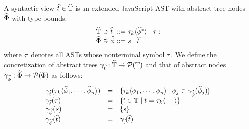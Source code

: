 A syntactic view $\widehat{t} \in \widehat{\mathbb{T}}$ is an extended JavaScript AST with
abstract tree nodes $\widehat{\Phi}$ with type bounds:
\[
  \begin{array}{l@{~}c@{~}l@{~}c@{~}l}
    \atreeset &\ni& \atree &::=& \ty_k \langle \anode^* \rangle \mid \ty: \\
    \anodeset &\ni& \anode &::=& \str \mid \atree\\
  \end{array}
\]
where $\tau$ denotes all ASTs whose nonterminal symbol $\tau$. We define the
concretization of abstract trees $\gamma_{\widehat{t}}: \widehat{\mathbb{T}} \rightarrow
\mathcal{P}(\mathbb{T})$ and that of abstract nodes $\gamma_{\widehat{\phi}}: \widehat{\Phi}
\rightarrow \mathcal{P}(\Phi)$ as follows:
\[
  \begin{array}{lcl}
    \gamma_{\widehat{t}}(\tau_k \langle \widehat{\phi}_1, \cdots, \widehat{\phi}_n \rangle) &=&
    \{ \tau_k \langle \phi_1, \cdots, \phi_n \rangle \mid \phi_j \in
    \gamma_{\widehat{\phi}}(\widehat{\phi}_j) \}\\

    \gamma_{\widehat{t}}(\tau) &=&
    \{ t \in \mathbb{T} \mid t = \tau_k \langle \cdots \rangle \}\\

    \gamma_{\widehat{\phi}}(s) &=& \{ s \}\\

    \gamma_{\widehat{\phi}}(\widehat{t}) &=& \gamma_{\widehat{t}}(\widehat{t})\\
  \end{array}
\]
